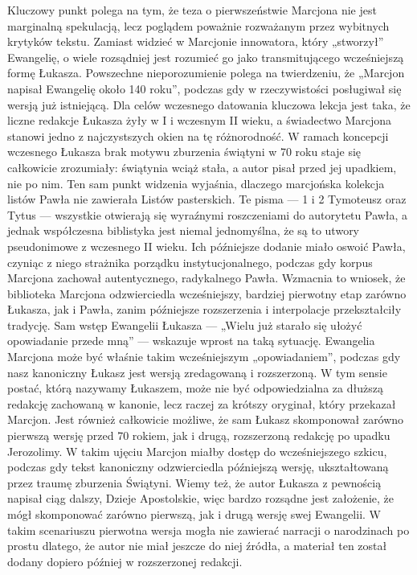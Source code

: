 Kluczowy punkt polega na tym, że teza o pierwszeństwie Marcjona nie jest marginalną spekulacją, lecz poglądem poważnie rozważanym przez wybitnych krytyków tekstu.
Zamiast widzieć w Marcjonie innowatora, który „stworzył” Ewangelię, o wiele rozsądniej jest rozumieć go jako transmitującego wcześniejszą formę Łukasza.
Powszechne nieporozumienie polega na twierdzeniu, że „Marcjon napisał Ewangelię około 140 roku”, podczas gdy w rzeczywistości posługiwał się wersją już istniejącą.
Dla celów wczesnego datowania kluczowa lekcja jest taka, że liczne redakcje Łukasza żyły w I i wczesnym II wieku, a świadectwo Marcjona stanowi jedno z najczystszych okien na tę różnorodność.
W ramach koncepcji wczesnego Łukasza brak motywu zburzenia świątyni w 70 roku staje się całkowicie zrozumiały: świątynia wciąż stała, a autor pisał przed jej upadkiem, nie po nim.
Ten sam punkt widzenia wyjaśnia, dlaczego marcjońska kolekcja listów Pawła nie zawierała Listów pasterskich.
Te pisma — 1 i 2 Tymoteusz oraz Tytus — wszystkie otwierają się wyraźnymi roszczeniami do autorytetu Pawła, a jednak współczesna biblistyka jest niemal jednomyślna, że są to utwory pseudonimowe z wczesnego II wieku.
Ich późniejsze dodanie miało oswoić Pawła, czyniąc z niego strażnika porządku instytucjonalnego, podczas gdy korpus Marcjona zachował autentycznego, radykalnego Pawła.
Wzmacnia to wniosek, że biblioteka Marcjona odzwierciedla wcześniejszy, bardziej pierwotny etap zarówno Łukasza, jak i Pawła, zanim późniejsze rozszerzenia i interpolacje przekształciły tradycję.
Sam wstęp Ewangelii Łukasza — „Wielu już starało się ułożyć opowiadanie przede mną” — wskazuje wprost na taką sytuację.
Ewangelia Marcjona może być właśnie takim wcześniejszym „opowiadaniem”, podczas gdy nasz kanoniczny Łukasz jest wersją zredagowaną i rozszerzoną.
W tym sensie postać, którą nazywamy Łukaszem, może nie być odpowiedzialna za dłuższą redakcję zachowaną w kanonie, lecz raczej za krótszy oryginał, który przekazał Marcjon.
Jest również całkowicie możliwe, że sam Łukasz skomponował zarówno pierwszą wersję przed 70 rokiem, jak i drugą, rozszerzoną redakcję po upadku Jerozolimy.
W takim ujęciu Marcjon miałby dostęp do wcześniejszego szkicu, podczas gdy tekst kanoniczny odzwierciedla późniejszą wersję, ukształtowaną przez traumę zburzenia Świątyni.
Wiemy też, że autor Łukasza z pewnością napisał ciąg dalszy, Dzieje Apostolskie, więc bardzo rozsądne jest założenie, że mógł skomponować zarówno pierwszą, jak i drugą wersję swej Ewangelii.
W takim scenariuszu pierwotna wersja mogła nie zawierać narracji o narodzinach po prostu dlatego, że autor nie miał jeszcze do niej źródła, a materiał ten został dodany dopiero później w rozszerzonej redakcji.

